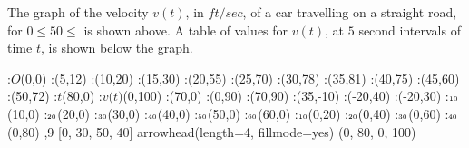 \question The graph of the velocity $v(t)$, in $ft/sec$, of a car travelling 
on a straight road, for $0\leq 50\leq$ is shown above. A table of values for
$v(t)$, at $5$ second intervals of time $t$, is shown below the graph.

  \begin{marginfigure}
      :$O$(0,0)
      :(5,12)
      :(10,20)
      :(15,30)
      :(20,55)
      :(25,70)
      :(30,78)
      :(35,81)
      :(40,75)
      :(45,60)
      :(50,72)
      \def\Xmax{80}
      \def\Ymax{100}
      \def\XmaxGrid{70}
      \def\YmaxGrid{90}
      :$\textit{t}$(\Xmax,0)
      :$\textit{v(t)}$(0,\Ymax)
      :(\XmaxGrid,0)
      :(0,\YmaxGrid)
      :(\XmaxGrid,\YmaxGrid)
      :(35,-10) 
      :(-20,40)
      :(-20,30)
      :$\tiny\text{10}$(10,0)
      :$\tiny\text{20}$(20,0)
      :$\tiny\text{30}$(30,0)
      :$\tiny\text{40}$(40,0)
      :$\tiny\text{50}$(50,0)
      :$\tiny\text{60}$(60,0)
      :$\tiny\text{10}$(0,20)
      :$\tiny\text{20}$(0,40)
      :$\tiny\text{30}$(0,60)
      :$\tiny\text{40}$(0,80)
    \figdrawbegin{}
      \figdrawline [0,101]
      \figdrawline [101,102]
      \figdrawline [102,103]
      \figdrawline [103,104]
      \figdrawline [104,105]
      \figdrawline [105,106]
      \figdrawline [106,107]
      \figdrawline [107,108]
      \figdrawline [108,109]
      \figdrawline [109,110]
      ,9 [0, 30, 50, 40]
      \figset arrowhead(length=4, fillmode=yes)
      (0, \Xmax, 0, \Ymax)
    \figdrawend
    \centerline{\box\figBoxA}
  \end{marginfigure}
